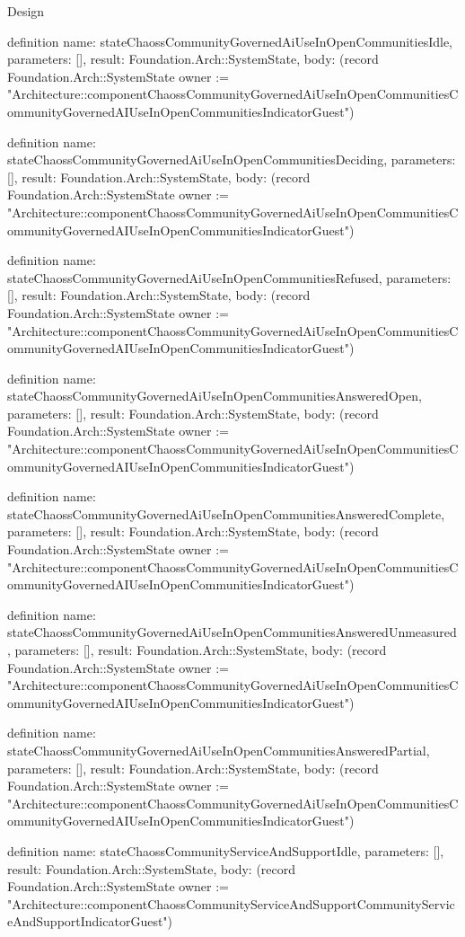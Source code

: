 \begin{lexlean}{Design}
\begin{semanticmodule}
definition{
  name: stateChaossCommunityGovernedAiUseInOpenCommunitiesIdle,
  parameters: [],
  result: Foundation.Arch::SystemState,
  body: (record Foundation.Arch::SystemState {owner := "Architecture::componentChaossCommunityGovernedAiUseInOpenCommunitiesCommunityGovernedAIUseInOpenCommunitiesIndicatorGuest"})
}

definition{
  name: stateChaossCommunityGovernedAiUseInOpenCommunitiesDeciding,
  parameters: [],
  result: Foundation.Arch::SystemState,
  body: (record Foundation.Arch::SystemState {owner := "Architecture::componentChaossCommunityGovernedAiUseInOpenCommunitiesCommunityGovernedAIUseInOpenCommunitiesIndicatorGuest"})
}

definition{
  name: stateChaossCommunityGovernedAiUseInOpenCommunitiesRefused,
  parameters: [],
  result: Foundation.Arch::SystemState,
  body: (record Foundation.Arch::SystemState {owner := "Architecture::componentChaossCommunityGovernedAiUseInOpenCommunitiesCommunityGovernedAIUseInOpenCommunitiesIndicatorGuest"})
}

definition{
  name: stateChaossCommunityGovernedAiUseInOpenCommunitiesAnsweredOpen,
  parameters: [],
  result: Foundation.Arch::SystemState,
  body: (record Foundation.Arch::SystemState {owner := "Architecture::componentChaossCommunityGovernedAiUseInOpenCommunitiesCommunityGovernedAIUseInOpenCommunitiesIndicatorGuest"})
}

definition{
  name: stateChaossCommunityGovernedAiUseInOpenCommunitiesAnsweredComplete,
  parameters: [],
  result: Foundation.Arch::SystemState,
  body: (record Foundation.Arch::SystemState {owner := "Architecture::componentChaossCommunityGovernedAiUseInOpenCommunitiesCommunityGovernedAIUseInOpenCommunitiesIndicatorGuest"})
}

definition{
  name: stateChaossCommunityGovernedAiUseInOpenCommunitiesAnsweredUnmeasured,
  parameters: [],
  result: Foundation.Arch::SystemState,
  body: (record Foundation.Arch::SystemState {owner := "Architecture::componentChaossCommunityGovernedAiUseInOpenCommunitiesCommunityGovernedAIUseInOpenCommunitiesIndicatorGuest"})
}

definition{
  name: stateChaossCommunityGovernedAiUseInOpenCommunitiesAnsweredPartial,
  parameters: [],
  result: Foundation.Arch::SystemState,
  body: (record Foundation.Arch::SystemState {owner := "Architecture::componentChaossCommunityGovernedAiUseInOpenCommunitiesCommunityGovernedAIUseInOpenCommunitiesIndicatorGuest"})
}

definition{
  name: stateChaossCommunityServiceAndSupportIdle,
  parameters: [],
  result: Foundation.Arch::SystemState,
  body: (record Foundation.Arch::SystemState {owner := "Architecture::componentChaossCommunityServiceAndSupportCommunityServiceAndSupportIndicatorGuest"})
}


\end{semanticmodule}
\end{lexlean}

